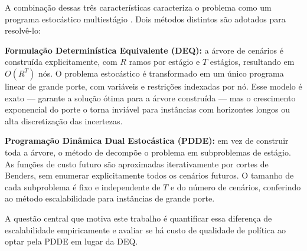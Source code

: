 A combinação dessas três características caracteriza o problema como um programa estocástico multiestágio \cite{shapiro2009,birge2011}. Dois métodos distintos são adotados para resolvê-lo:

\textbf{Formulação Determinística Equivalente (DEQ):} a árvore de cenários é construída explicitamente, com $R$ ramos por estágio e $T$ estágios, resultando em $O(R^T)$ nós. O problema estocástico é transformado em um único programa linear de grande porte, com variáveis e restrições indexadas por nó. Esse modelo é exato --- garante a solução ótima para a árvore construída --- mas o crescimento exponencial do porte o torna inviável para instâncias com horizontes longos ou alta discretização das incertezas.

\textbf{Programação Dinâmica Dual Estocástica (PDDE):} em vez de construir toda a árvore, o método de  decompõe o problema em subproblemas de estágio. As funções de custo futuro são aproximadas iterativamente por cortes de Benders, sem enumerar explicitamente todos os cenários futuros. O tamanho de cada subproblema é fixo e independente de $T$ e do número de cenários, conferindo ao método escalabilidade para instâncias de grande porte.

A questão central que motiva este trabalho é quantificar essa diferença de escalabilidade empiricamente e avaliar se há custo de qualidade de política ao optar pela PDDE em lugar da DEQ.
